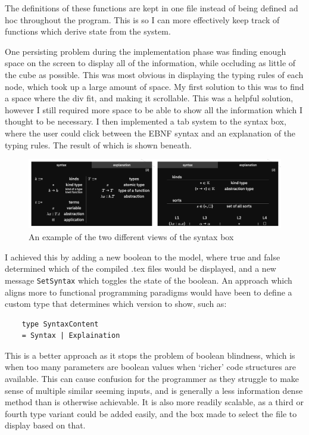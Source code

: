 \documentclass{l4proj}
\begin{document}
The definitions of these functions are kept in one file instead of being defined ad hoc throughout the program.  This is so I can more effectively keep track of functions which derive state from the system.

One persisting problem during the implementation phase was finding enough space on the screen to display all of the information, while occluding as little of the cube as possible.  This was most obvious in displaying the typing rules of each node, which took up a large amount of space.  My first solution to this was to find a space where the div fit, and making it scrollable.  This was a helpful solution, however I still required more space to be able to show all the information which I thought to be necessary.  I then implemented a tab system to the syntax box, where the user could click between the EBNF syntax and an explanation of the typing rules. The result of which is shown beneath.

\begin{figure}[h!]
    \centering
    \includegraphics[width=0.8\linewidth]{dissertation/images/syntax_collage.png}
    \caption{An example of the two different views of the syntax box}
    \label{fig:enter-label}
\end{figure}

I achieved this by adding a new boolean to the model, where true and false determined which of the compiled .tex files would be displayed, and a new message \texttt{SetSyntax} which toggles the state of the boolean.  An approach which aligns more to functional programming paradigms would have been to define a custom type that determines which version to show, such as:

\begin{lstlisting}
    type SyntaxContent
    = Syntax | Explaination
\end{lstlisting}

This is a better approach as it stops the problem of boolean blindness, which is when too many parameters are boolean values when `richer' code structures are available.  This can cause confusion for the programmer as they struggle to make sense of multiple similar seeming inputs, and is generally a less information dense method than is otherwise achievable.  It is also more readily scalable, as a third or fourth type variant could be added easily, and the box made to select the file to display based on that.
\end{document}
